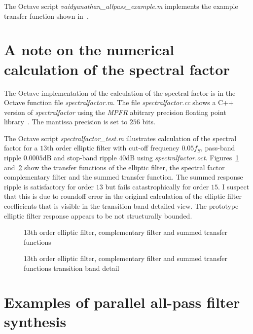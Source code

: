 \documentclass[a4paper,twoside,10pt,english]{report}
\begin{document}
The Octave script \emph{vaidyanathan\_allpass\_example.m} implements the example
transfer function shown 
in~\cite[Section V]{VaidyanathanMitraNuevo_LowSensitivityIIRDigitalFilters}.

\section{A note on the numerical calculation of the spectral factor}
The Octave implementation of the calculation of the spectral factor is in the
Octave function file \emph{spectralfactor.m}. 
The file \emph{spectralfactor.cc} shows a C++ version of 
\emph{spectralfactor} using the \emph{MPFR} abitrary precision floating
point library~\cite{Fousse_MPFR,GNU_GMP,Fousse:2007:MMB:1236463.1236468}. The
mantissa precision is set to $256$ bits.

The Octave script \emph{spectralfactor\_test.m}
 illustrates calculation of the spectral
factor for a $13$th order elliptic filter with cut-off frequency $0.05f_{S}$, 
pass-band ripple $0.0005$dB and stop-band ripple $40$dB using 
\emph{spectralfactor.oct}. Figures~\ref{fig:spectralfactor-test-ellip13-0-05}
and~\ref{fig:spectralfactor-test-ellip13-0-05-detail} show the transfer
functions of the elliptic filter, the spectral factor complementary filter
and the summed transfer function. The summed response ripple is satisfactory for
order $13$ but fails catastrophically for order $15$. I suspect that this is
due to roundoff error in the original calculation of the elliptic filter
coefficients that is visible in the transition band detailed view. The
prototype elliptic filter response appears to be not structurally bounded.
\begin{figure}[!htbp]
\begin{center}
\scalebox{0.7}{}
\caption{13th order elliptic filter, complementary filter and summed transfer functions}
\label{fig:spectralfactor-test-ellip13-0-05}
\end{center}
\end{figure}
\begin{figure}[!htbp]
\begin{center}
\scalebox{0.7}{}
\caption{13th order elliptic filter, complementary filter and summed transfer functions transition band detail}
\label{fig:spectralfactor-test-ellip13-0-05-detail}
\end{center}
\end{figure}
\clearpage
\section{Examples of parallel all-pass filter synthesis}
\end{document}
